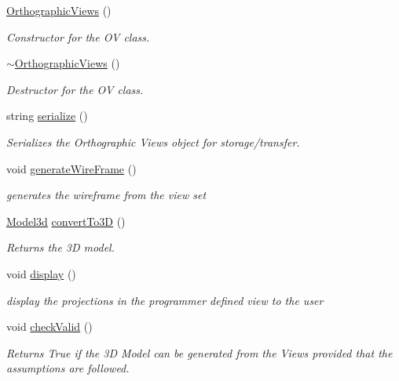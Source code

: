 \begin{DoxyCompactItemize}
\item 
\mbox{\hyperlink{class_orthographic_views_a4698ffe80819cb2106f61a336590256a}{Orthographic\+Views}} ()
\begin{DoxyCompactList}\small\item\em Constructor for the OV class. \end{DoxyCompactList}\item 
\mbox{\hyperlink{class_orthographic_views_ab6d622dcf326ace286b1bfea8cbdb75e}{$\sim$\+Orthographic\+Views}} ()
\begin{DoxyCompactList}\small\item\em Destructor for the OV class. \end{DoxyCompactList}\item 
string \mbox{\hyperlink{class_orthographic_views_a207741d30f67bf0da1356c10cc819731}{serialize}} ()
\begin{DoxyCompactList}\small\item\em Serializes the Orthographic Views object for storage/transfer. \end{DoxyCompactList}\item 
void \mbox{\hyperlink{class_orthographic_views_ab169cb6a89b9575d7814a683240567ac}{generate\+Wire\+Frame}} ()
\begin{DoxyCompactList}\small\item\em generates the wireframe from the view set \end{DoxyCompactList}\item 
\mbox{\hyperlink{class_model3d}{Model3d}} \mbox{\hyperlink{class_orthographic_views_a1048d31d2a202a8b5bc40a459d86e43b}{convert\+To3D}} ()
\begin{DoxyCompactList}\small\item\em Returns the 3D model. \end{DoxyCompactList}\item 
void \mbox{\hyperlink{class_orthographic_views_a9e5f48f91dd92b22ce9418663cdbf8f8}{display}} ()
\begin{DoxyCompactList}\small\item\em display the projections in the programmer defined view to the user \end{DoxyCompactList}\item 
void \mbox{\hyperlink{class_orthographic_views_a81792a7d224bada0a04d0917cc5d7a53}{check\+Valid}} ()
\begin{DoxyCompactList}\small\item\em Returns True if the 3D Model can be generated from the Views provided that the assumptions are followed. \end{DoxyCompactList}\end{DoxyCompactItemize}

